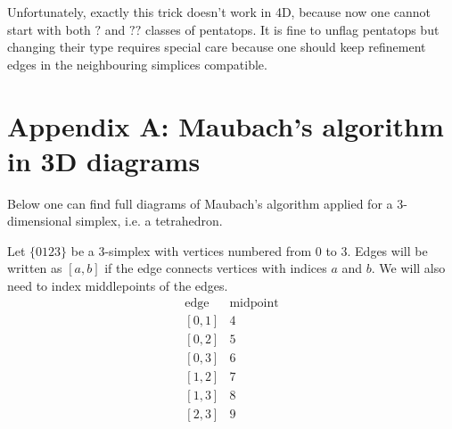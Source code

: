 \documentclass[a4paper,12pt]{amsart}
\numberwithin{equation}{section}
\begin{document}
Unfortunately, exactly this trick doesn't work in 4D, because now one cannot start with both $?$ and $??$ classes of pentatops. It is fine to unflag pentatops but changing their type requires special care because one should keep refinement edges in the neighbouring simplices compatible.

\section{Appendix A: Maubach's algorithm in 3D diagrams}

Below one can find full diagrams of Maubach's algorithm applied for a 3-dimensional simplex, i.e. a tetrahedron.

Let $\{0123\}$ be a 3-simplex with vertices numbered from 0 to 3. Edges will be written as $[a,b]$ if the edge connects vertices with indices $a$ and $b$.
We will also need to index middlepoints of the edges. 
$$
\begin{array}{cc}
\mbox{edge} & \mbox{midpoint} \\
\left[0,1\right] & 4 \\
\left[0,2\right] & 5 \\
\left[0,3\right] & 6 \\
\left[1,2\right] & 7 \\
\left[1,3\right] & 8 \\
\left[2,3\right] & 9 \\
\end{array}
$$
\end{document}
